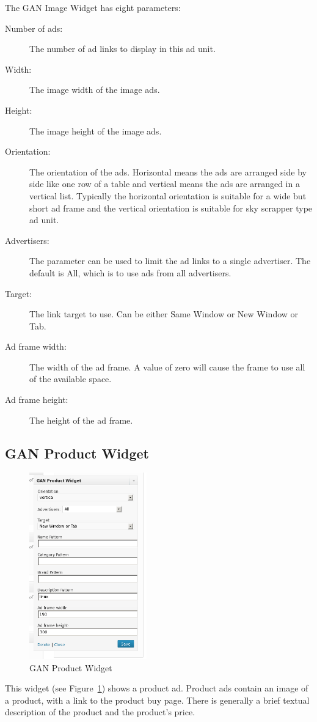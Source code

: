 \documentclass[letterpaper]{article}
\begin{document}
The GAN Image Widget has eight parameters:
\begin{description}
  \item[Number of ads:] The number of ad links to display in
this ad unit.
  \item[Width:] The image width of the image ads.
  \item[Height:] The image height of the image ads.
  \item[Orientation:] The orientation of the ads. Horizontal
means the ads are arranged side by side like one row of a table and
vertical means the ads are arranged in a vertical list. Typically the
horizontal orientation is suitable for a wide but short ad frame and the
vertical orientation is suitable for sky scrapper type ad unit.
  \item[Advertisers:] The parameter can be used to limit the ad links to
a single advertiser.  The default is All, which is to use ads from all
advertisers.
  \item[Target:] The link target to use. Can be either Same 
Window or New Window or Tab.
  \item[Ad frame width:] The width of the ad frame. A value
of zero will cause the frame to use all of the available space.
  \item[Ad frame height:] The height of the ad frame.
\end{description}


\subsection{GAN Product Widget}

\begin{figure}[ht]
\begin{centering}
\includegraphics[width=2in]{ganproductwidget.png}
\caption{GAN Product Widget}
\label{fig:ganproductwidget}
\end{centering}
\end{figure}
This widget (see Figure~\ref{fig:ganproductwidget}) shows a product ad. 
Product ads contain an image of a product, with a link to the product
buy page.  There is generally a brief textual description of the product
and the product's price.
\end{document}
